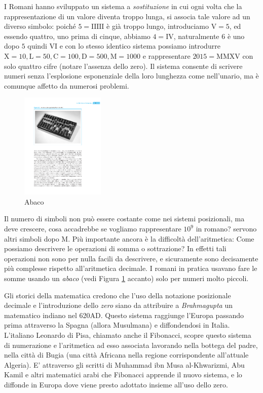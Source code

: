 {I Romani hanno sviluppato un sistema a
\emph{sostituzione} in cui ogni volta che la rappresentazione di un valore
diventa troppo lunga, si associa tale valore ad un diverso simbolo: poiché $5 =
\mathrm{IIIII}$ è già troppo lungo, introduciamo $\mathrm{V} = 5$, ed essendo
quattro, uno prima di cinque, abbiamo $4 = \mathrm{IV}$, naturalmente $6$ è uno
dopo $5$ quindi $\mathrm{VI}$ e con lo stesso identico sistema possiamo
introdurre $\mathrm{X} = 10, \mathrm{L} = 50, \mathrm{C} = 100, \mathrm{D} =
500, \mathrm{M} = 1000$ e rappresentare $2015 = \mathrm{MMXV}$ con solo quattro
cifre (notare l'assenza dello zero). Il sistema consente di scrivere numeri
senza l'esplosione esponenziale della loro lunghezza come nell'unario, ma è
comunque affetto da numerosi problemi.

\begin{figure}
\vspace{-2ex}
\captionsetup{font=small}
\centering \includegraphics[width=4cm]{abaco.pdf}
\caption{Abaco}\label{fig:abaco}
\end{figure}
Il numero di simboli non può essere costante come nei sistemi posizionali, ma
deve crescere, cosa accadrebbe se vogliamo rappresentare $10^9$ in romano?
servono altri simboli dopo $\mathrm{M}$. Più importante ancora è la difficoltà
dell'aritmetica: Come possiamo descrivere le operazioni di somma o sottrazione?
In effetti tali operazioni non sono per nulla facili da descrivere, e
sicuramente sono decisamente più complesse rispetto all'aritmetica decimale. I
romani in pratica usavano fare le somme usando un \emph{abaco} (vedi Figura \ref{fig:abaco} accanto) 
solo per numeri molto piccoli.

Gli storici della matematica credono che l'uso della notazione posizionale decimale e l'introduzione dello \emph{zero} siano da attribuire a \emph{Brahmagupta} un matematico indiano nel 620\textrm{AD}. Questo sistema raggiunge l'Europa passando prima attraverso la Spagna (allora Musulmana) e diffondendosi in Italia. L'italiano Leonardo di Pisa, chiamato anche il Fibonacci, scopre questo sistema di numerazione e l'aritmetica ad esso associata lavorando nella bottega del padre, nella città di Bugia (una città Africana nella regione corrispondente all'attuale Algeria).
E' attraverso gli scritti di Muhammad ibn Musa al-Khwarizmi, Abu Kamil e altri matematici arabi che Fibonacci apprende il nuovo sistema, e lo diffonde in Europa dove viene presto adottato insieme all'uso dello zero. 

}
